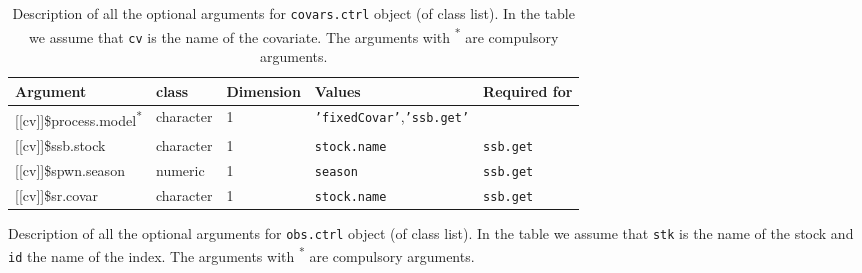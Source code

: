 \begin{landscape}
\begin{table}[!ht]
\end{table}	


\begin{table}[!ht]

  \centering
  \begin{footnotesize}

    \caption{Description of all the optional arguments for \texttt{covars.ctrl} object (of class list).
    In the table we assume that \texttt{cv} is the name of the covariate.
    The arguments with \textsuperscript{*} are compulsory arguments.}
    
    \label{tb:A3.table4}

    \begin{threeparttable}

      \begin{tabular}{lllll} %
        \hline
        Argument & class & Dimension & Values & Required for \\
        \hline
        {[[cv]]}\$process.model\textsuperscript{*} & character & 1 & \texttt{'fixedCovar'},\texttt{'ssb.get'}  &	\\
        {[[cv]]}\$ssb.stock & character & 1 & \texttt{stock.name} &	\texttt{ssb.get} \\
        {[[cv]]}\$spwn.season & numeric & 1 & \texttt{season} &	\texttt{ssb.get} \\
        {[[cv]]}\$sr.covar & character & 1 & \texttt{stock.name} &	\texttt{ssb.get} \\
        \hline
      \end{tabular}

    \end{threeparttable}
  \end{footnotesize}

\end{table}


\begin{table}[!ht]

  \centering
  \begin{footnotesize}

    \caption{Description of all the optional arguments for \texttt{obs.ctrl} object (of class list).
    In the table we assume that \texttt{stk} is the name of the stock and \texttt{id} the name of the index.
    The arguments with \textsuperscript{*} are compulsory arguments.}
    

\end{footnotesize}
\end{table}
\end{landscape}

